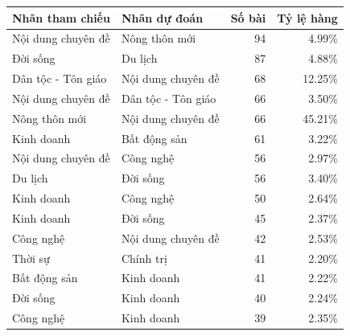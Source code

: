 \begin{tabularx}{\linewidth}{>{\raggedright\arraybackslash}X>{\raggedright\arraybackslash}Xrr}
\toprule
Nhãn tham chiếu & Nhãn dự đoán & Số bài & Tỷ lệ hàng\\\midrule
Nội dung chuyên đề & Nông thôn mới & 94 & 4.99\%\\
Đời sống & Du lịch & 87 & 4.88\%\\
Dân tộc - Tôn giáo & Nội dung chuyên đề & 68 & 12.25\%\\
Nội dung chuyên đề & Dân tộc - Tôn giáo & 66 & 3.50\%\\
Nông thôn mới & Nội dung chuyên đề & 66 & 45.21\%\\
Kinh doanh & Bất động sản & 61 & 3.22\%\\
Nội dung chuyên đề & Công nghệ & 56 & 2.97\%\\
Du lịch & Đời sống & 56 & 3.40\%\\
Kinh doanh & Công nghệ & 50 & 2.64\%\\
Kinh doanh & Đời sống & 45 & 2.37\%\\
Công nghệ & Nội dung chuyên đề & 42 & 2.53\%\\
Thời sự & Chính trị & 41 & 2.20\%\\
Bất động sản & Kinh doanh & 41 & 2.22\%\\
Đời sống & Kinh doanh & 40 & 2.24\%\\
Công nghệ & Kinh doanh & 39 & 2.35\%\\
\bottomrule\end{tabularx}
